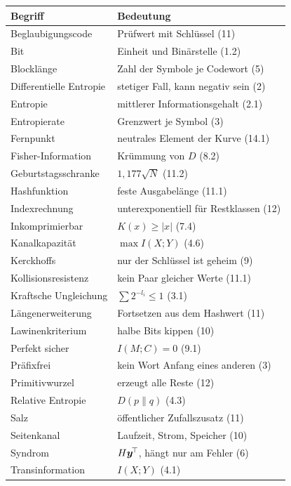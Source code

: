 \begin{merksatz}
\begin{center}
{\small
\renewcommand{\arraystretch}{1.3}
\begin{longtable}{@{}P{3.6cm}P{5.0cm}@{}}
\toprule
\textbf{Begriff} & \textbf{Bedeutung}\\
\midrule
\endhead
Beglaubigungscode & Prüfwert mit Schlüssel (11)\\
Bit & Einheit und Binärstelle (1.2)\\
Blocklänge & Zahl der Symbole je Codewort (5)\\
Differentielle Entropie & stetiger Fall, kann negativ sein (2)\\
Entropie & mittlerer Informationsgehalt (2.1)\\
Entropierate & Grenzwert je Symbol (3)\\
Fernpunkt & neutrales Element der Kurve (14.1)\\
Fisher-Information & Krümmung von $D$ (8.2)\\
Geburtstagsschranke & $1{,}177\sqrt N$ (11.2)\\
Hashfunktion & feste Ausgabelänge (11.1)\\
Indexrechnung & unterexponentiell für Restklassen (12)\\
Inkomprimierbar & $K(x)\ge|x|$ (7.4)\\
Kanalkapazität & $\max I(X;Y)$ (4.6)\\
Kerckhoffs & nur der Schlüssel ist geheim (9)\\
Kollisionsresistenz & kein Paar gleicher Werte (11.1)\\
Kraftsche Ungleichung & $\sum2^{-l_i}\le1$ (3.1)\\
Längenerweiterung & Fortsetzen aus dem Hashwert (11)\\
Lawinenkriterium & halbe Bits kippen (10)\\
Perfekt sicher & $I(M;C)=0$ (9.1)\\
Präfixfrei & kein Wort Anfang eines anderen (3)\\
Primitivwurzel & erzeugt alle Reste (12)\\
Relative Entropie & $D(p\|q)$ (4.3)\\
Salz & öffentlicher Zufallszusatz (11)\\
Seitenkanal & Laufzeit, Strom, Speicher (10)\\
Syndrom & $H\boldsymbol{y}^{\!\top}$, hängt nur am Fehler (6)\\
Transinformation & $I(X;Y)$ (4.1)\\

\end{longtable}}
\end{center}
\end{merksatz}
